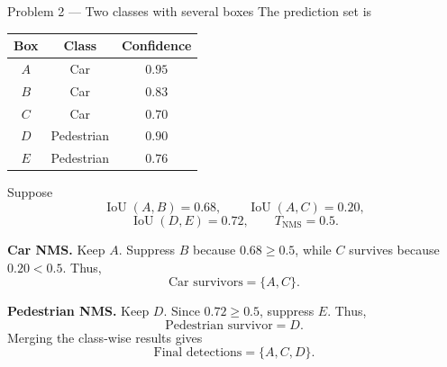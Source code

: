 \documentclass[11pt]{article}
\begin{document}
\begin{practicebox}{Problem 2 --- Two classes with several boxes}
The prediction set is

\begin{center}
\begin{tabular}{ccc}
\toprule
\textbf{Box} & \textbf{Class} & \textbf{Confidence} \\
\midrule
\(A\) & Car & \(0.95\) \\
\(B\) & Car & \(0.83\) \\
\(C\) & Car & \(0.70\) \\
\(D\) & Pedestrian & \(0.90\) \\
\(E\) & Pedestrian & \(0.76\) \\
\bottomrule
\end{tabular}
\end{center}

Suppose
\[
\operatorname{IoU}(A,B)=0.68,
\qquad
\operatorname{IoU}(A,C)=0.20,
\]
\[
\operatorname{IoU}(D,E)=0.72,
\qquad
T_{\mathrm{NMS}}=0.5.
\]

\textbf{Car NMS.} Keep \(A\). Suppress \(B\) because \(0.68\geq0.5\), while \(C\) survives because \(0.20<0.5\). Thus,
\[
\boxed{\text{Car survivors}=\{A,C\}}.
\]

\textbf{Pedestrian NMS.} Keep \(D\). Since \(0.72\geq0.5\), suppress \(E\). Thus,
\[
\boxed{\text{Pedestrian survivor}=D}.
\]
Merging the class-wise results gives
\[
\boxed{\text{Final detections}=\{A,C,D\}}.
\]
\end{practicebox}
\end{document}
